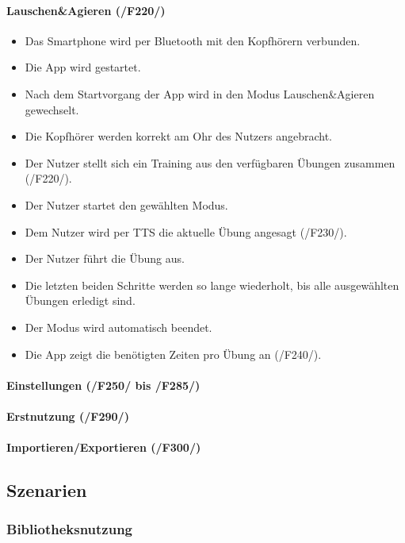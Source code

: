 \documentclass[a4paper,12pt]{article}
\begin{document}
  \paragraph{Lauschen\&Agieren (/F220/)}
  \begin{itemize}
    \item[] Das Smartphone wird per Bluetooth mit den Kopfhörern verbunden.
    \item[] Die App wird gestartet.
    \item[] Nach dem Startvorgang der App wird in den Modus \glqq Lauschen\&Agieren\grqq{} gewechselt.
    \item[] Die Kopfhörer werden korrekt am Ohr des Nutzers angebracht.
    \item[] Der Nutzer stellt sich ein Training aus den verfügbaren Übungen zusammen (/F220/).
    \item[] Der Nutzer startet den gewählten Modus.
    \item[] Dem Nutzer wird per \Gls{TTS} die aktuelle Übung angesagt (/F230/).
    \item[] Der Nutzer führt die Übung aus.
    \item[] Die letzten beiden Schritte werden so lange wiederholt, bis alle ausgewählten Übungen erledigt sind.
    \item[] Der Modus wird automatisch beendet.
    \item[] Die App zeigt die benötigten Zeiten pro Übung an (/F240/).
  \end{itemize}

  \paragraph{Einstellungen (/F250/ bis /F285/)}

  \paragraph{Erstnutzung (/F290/)}

  \paragraph{Importieren/Exportieren (/F300/)}


  \subsection{Szenarien}
    \subsubsection{Bibliotheksnutzung}
\end{document}
